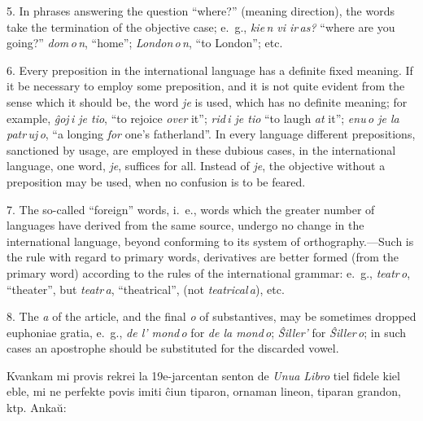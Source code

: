 \documentclass[12pt,twoside]{book}
\begin{document}
5. In phrases answering the question “where?” (meaning direction), the words take the termination of the objective case; e.~g., \emph{kie\,n vi ir\,as?} “where are you going?” \emph{dom\,o\,n}, “home”; \emph{London\,o\,n}, “to London”; etc.

6. Every preposition in the international language has a definite fixed meaning. If it be necessary to employ some preposition, and it is not quite evident from the sense which it should be, the word \emph{je} is used, which has no definite meaning; for example, \emph{ĝoj\,i je tio}, “to rejoice \emph{over} it”; \emph{rid\,i je tio} “to laugh \emph{at} it”; \emph{enu\,o je la patr\,uj\,o}, “a longing \emph{for} one’s fatherland”. In every language different prepositions, sanctioned by usage, are employed in these dubious cases, in the international language, one word, \emph{je}, suffices for all. Instead of \emph{je}, the objective without a preposition may be used, when no confusion is to be feared.

7. The so-called “foreign” words, i.~e., words which the greater number of languages have derived from the same source, undergo no change in the international language, beyond conforming to its system of orthography.---Such is the rule with regard to primary words, derivatives are better formed (from the primary word) according to the rules of the international grammar: e.~g., \emph{teatr\,o}, “theater”, but \emph{teatr\,a}, “theatrical”, (not \emph{teatrical\,a}), etc.

8. The \emph{a} of the article, and the final \emph{o} of substantives, may be sometimes dropped euphoniae gratia, e.~g., \emph{de l’ mond\,o} for \emph{de la mond\,o}; \emph{Ŝiller’} for \emph{Ŝiller\,o}; in such cases an apostrophe should be substituted for the discarded vowel. 

\sectionline

%
%


%
%
\kolofono

\small Kvankam mi provis rekrei la 19e-jarcentan \glqq senton\grqq{} de \emph{Unua Libro} tiel fidele kiel eble, mi ne perfekte povis imiti ĉiun tiparon, ornaman lineon, tiparan grandon, ktp.  Ankaŭ:
\end{document}
